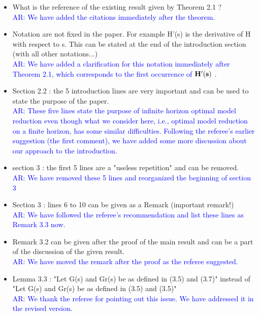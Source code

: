 \documentclass[11pt]{article}
\def\serkan#1{\textcolor{blue}{{#1}}}
\begin{document}
\begin{itemize}
\item What is the reference of the existing result given by Theorem 2.1 ? \\ [1ex]
\serkan{\textsf{AR}:  We have added the citations immediately after the theorem.}  

\item Notation are not fixed in the paper. For example H'(s) is the
derivative of H with respect to s. This can be stated at the end of the
introduction section (with all other notations...)\\ [1ex]
\serkan{\textsf{AR}:  We have added a clarification for this notation immediately after Theorem 2.1, which corresponds to the first occurrence of $\bf{H}'(s)$ .} 

\item  Section 2.2 : the 5 introduction lines are very important and can be
used to state the purpose of the paper. \\ [1ex]
\serkan{\textsf{AR}: These five lines state the purpose of infinite horizon optimal model reduction even though what we consider here, i.e., optimal model reduction on a finite horizon, has some similar difficulties. Following the referee's earlier suggestion (the first comment), we have added some more discussion about our approach to the introduction.}

\item section 3 : the first 5 lines are a "useless repetition" and can be
removed. \\ [1ex]
\serkan{\textsf{AR}:  We have removed these 5 lines and reorganized the beginning of section 3 }


\item Section 3 : lines 6 to 10 can be given as a Remark (important remark!)  \\ [1ex]
\serkan{\textsf{AR}:  We have followed  the referee's recommendation and list these lines as Remark 3.3 now. }

\item Remark 3.2 can be given after the proof of the main result and can be
a part of the discussion of the given result. \\[1ex]
\serkan{\textsf{AR}:  We have moved the remark after the proof as the referee suggested. }

\item Lemma 3.3 : "Let G(s) and Gr(s) be as defined in (3.5) and (3.7)"
instead of "Let G(s) and Gr(s) be as defined in (3.5) and (3.5)" \\ [1ex]
\serkan{\textsf{AR}:  We thank the referee for pointing out this issue. We have addressed it in the revised version.} 


\end{itemize}
\end{document}
